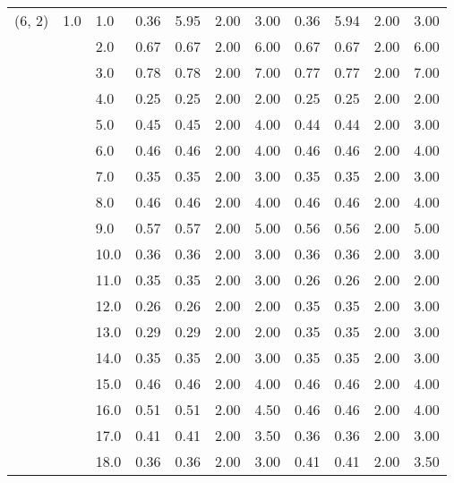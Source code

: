 \begin{tabular}{lllrrrrrrrr}
(6, 2) & 1.0 & 1.0  &       0.36 &      5.95 & 2.00 &   3.00 &       0.36 &      5.94 & 2.00 &   3.00 \\
       &     & 2.0  &       0.67 &      0.67 & 2.00 &   6.00 &       0.67 &      0.67 & 2.00 &   6.00 \\
       &     & 3.0  &       0.78 &      0.78 & 2.00 &   7.00 &       0.77 &      0.77 & 2.00 &   7.00 \\
       &     & 4.0  &       0.25 &      0.25 & 2.00 &   2.00 &       0.25 &      0.25 & 2.00 &   2.00 \\
       &     & 5.0  &       0.45 &      0.45 & 2.00 &   4.00 &       0.44 &      0.44 & 2.00 &   3.00 \\
       &     & 6.0  &       0.46 &      0.46 & 2.00 &   4.00 &       0.46 &      0.46 & 2.00 &   4.00 \\
       &     & 7.0  &       0.35 &      0.35 & 2.00 &   3.00 &       0.35 &      0.35 & 2.00 &   3.00 \\
       &     & 8.0  &       0.46 &      0.46 & 2.00 &   4.00 &       0.46 &      0.46 & 2.00 &   4.00 \\
       &     & 9.0  &       0.57 &      0.57 & 2.00 &   5.00 &       0.56 &      0.56 & 2.00 &   5.00 \\
       &     & 10.0 &       0.36 &      0.36 & 2.00 &   3.00 &       0.36 &      0.36 & 2.00 &   3.00 \\
       &     & 11.0 &       0.35 &      0.35 & 2.00 &   3.00 &       0.26 &      0.26 & 2.00 &   2.00 \\
       &     & 12.0 &       0.26 &      0.26 & 2.00 &   2.00 &       0.35 &      0.35 & 2.00 &   3.00 \\
       &     & 13.0 &       0.29 &      0.29 & 2.00 &   2.00 &       0.35 &      0.35 & 2.00 &   3.00 \\
       &     & 14.0 &       0.35 &      0.35 & 2.00 &   3.00 &       0.35 &      0.35 & 2.00 &   3.00 \\
       &     & 15.0 &       0.46 &      0.46 & 2.00 &   4.00 &       0.46 &      0.46 & 2.00 &   4.00 \\
       &     & 16.0 &       0.51 &      0.51 & 2.00 &   4.50 &       0.46 &      0.46 & 2.00 &   4.00 \\
       &     & 17.0 &       0.41 &      0.41 & 2.00 &   3.50 &       0.36 &      0.36 & 2.00 &   3.00 \\
       &     & 18.0 &       0.36 &      0.36 & 2.00 &   3.00 &       0.41 &      0.41 & 2.00 &   3.50 \\

\end{tabular}
